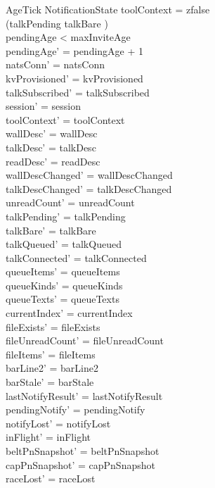 \documentclass[a4paper,10pt,fleqn]{article}
\begin{document}
\begin{schema}{AgeTick}
  \Delta NotificationState
  \where
  toolContext = zfalse \\
  (\dom talkPending \neq \emptyset \lor talkBare \neq \emptyset) \\
  pendingAge < maxInviteAge \\
  pendingAge' = pendingAge + 1 \\
  natsConn' = natsConn \\
  kvProvisioned' = kvProvisioned \\
  talkSubscribed' = talkSubscribed \\
  session' = session \\
  toolContext' = toolContext \\
  wallDesc' = wallDesc \\
  talkDesc' = talkDesc \\
  readDesc' = readDesc \\
  wallDescChanged' = wallDescChanged \\
  talkDescChanged' = talkDescChanged \\
  unreadCount' = unreadCount \\
  talkPending' = talkPending \\
  talkBare' = talkBare \\
  talkQueued' = talkQueued \\
  talkConnected' = talkConnected \\
  queueItems' = queueItems \\
  queueKinds' = queueKinds \\
  queueTexts' = queueTexts \\
  currentIndex' = currentIndex \\
  fileExists' = fileExists \\
  fileUnreadCount' = fileUnreadCount \\
  fileItems' = fileItems \\
  barLine2' = barLine2 \\
  barStale' = barStale \\
  lastNotifyResult' = lastNotifyResult \\
  pendingNotify' = pendingNotify \\
  notifyLost' = notifyLost \\
  inFlight' = inFlight \\
  beltPnSnapshot' = beltPnSnapshot \\
  capPnSnapshot' = capPnSnapshot \\
  raceLost' = raceLost \\

\end{schema}
\end{document}
